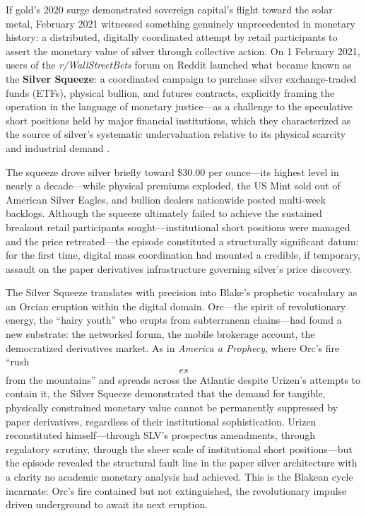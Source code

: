 \documentclass[
]{article}
\begin{document}
If gold's 2020 surge demonstrated sovereign capital's flight toward the
solar metal, February 2021 witnessed something genuinely unprecedented
in monetary history: a distributed, digitally coordinated attempt by
retail participants to assert the monetary value of silver through
collective action. On 1 February 2021, users of the
\emph{r/WallStreetBets} forum on Reddit launched what became known as
the \textbf{Silver Squeeze}: a coordinated campaign to purchase silver
exchange-traded funds (ETFs), physical bullion, and futures contracts,
explicitly framing the operation in the language of monetary
justice---as a challenge to the speculative short positions held by
major financial institutions, which they characterized as the source of
silver's systematic undervaluation relative to its physical scarcity and
industrial demand \citep{silverinstitute2021world}.

The squeeze drove silver briefly toward \$30.00 per ounce---its highest
level in nearly a decade---while physical premiums exploded, the US Mint
sold out of American Silver Eagles, and bullion dealers nationwide
posted multi-week backlogs. Although the squeeze ultimately failed to
achieve the sustained breakout retail participants
sought---institutional short positions were managed and the price
retreated---the episode constituted a structurally significant datum:
for the first time, digital mass coordination had mounted a credible, if
temporary, assault on the paper derivatives infrastructure governing
silver's price discovery.

The Silver Squeeze translates with precision into Blake's prophetic
vocabulary as an Orcian eruption within the digital domain. Orc---the
spirit of revolutionary energy, the ``hairy youth'' who erupts from
subterranean chains---had found a new substrate: the networked forum,
the mobile brokerage account, the democratized derivatives market. As in
\emph{America a Prophecy}, where Orc's fire ``rush\[es\] from the
mountains'' and spreads across the Atlantic despite Urizen's attempts to
contain it, the Silver Squeeze demonstrated that the demand for
tangible, physically constrained monetary value cannot be permanently
suppressed by paper derivatives, regardless of their institutional
sophistication. Urizen reconstituted himself---through SLV's prospectus
amendments, through regulatory scrutiny, through the sheer scale of
institutional short positions---but the episode revealed the structural
fault line in the paper silver architecture with a clarity no academic
monetary analysis had achieved. This is the Blakean cycle incarnate:
Orc's fire contained but not extinguished, the revolutionary impulse
driven underground to await its next eruption.
\end{document}
